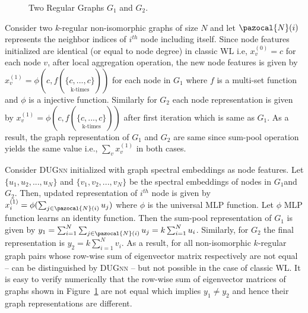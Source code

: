 \documentclass{article}
\newcommand{\Na}{\pazocal{N}}
\begin{document}
\begin{figure}[!h]
	\centering
	\caption{Two Regular Graphs $G_1$ and $G_2$.}\label{fig:reg_graphs}
\end{figure}

Consider two $k$-regular non-isomorphic graphs of size $N$ and let $\Na(i)$ represents the neighbor indices of $i^{th}$ node including itself.  Since node features initialized are identical (or equal to node degree) in classic WL  i.e, $x_v^{(0)} = c$ for each node $v$, after local aggregation operation, the new node features is given by $x_v^{(1)}=\phi(c, f(\underset{\text{k-times}}{\{c,...,c\}}))$ for  each node in $G_1$ where $f$ is a multi-set function and $\phi$ is a injective function. Similarly for $G_2$ each node representation is given by $x_v^{(1)}=\phi(c, f(\underset{\text{k-times}}{\{c,...,c\}}))$ after first iteration which is same as $G_1$. As a result, the graph representation of $G_1$ and $G_2$ are same since sum-pool operation yields the same value i.e., $\sum_{v}x_v^{(1)}$ in both cases. 

Consider \textsc{DUGnn}  initialized  with graph spectral embeddings  as node features. Let $\{u_1,u_2, ..., u_N\}$ and $\{v_1, v_2, ..., v_N\}$ be the spectral embeddings of nodes in $G_1$and $G_2$. Then, updated representation  of   $i^{th}$ node is given by  $x_i^{(1)}=\phi(\sum_{j \in \Na(i)}  u_{j})$ where $\phi$ is the universal MLP function.  Let $\phi$ MLP  function learns an identity function. Then the sum-pool representation of $G_1$ is given by $y_1  = \sum_{i=1}^{N}\sum_{j \in \Na(i)}  u_{j} = k \sum_{i=1}^{N} u_i$. Similarly, for $G_2$ the final representation is  $y_2= k\sum_{i=1}^{N} v_i$.  As a result, for all non-isomorphic $k$-regular graph pairs whose  row-wise sum of eigenvector matrix respectively are not equal -- can be distinguished by \textsc{DUGnn} -- but not possible in the case of   classic WL.  It is easy to verify numerically that the row-wise sum of eigenvector matrices  of graphs   shown in Figure~\ref{fig:reg_graphs}  are not equal which implies  $y_1\neq y_2$ and hence their graph representations  are different.
\end{document}
